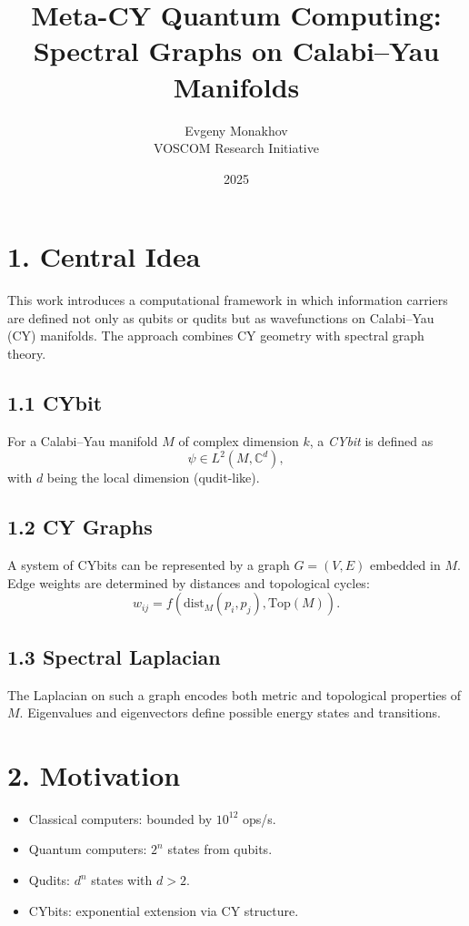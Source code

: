\documentclass[12pt,a4paper]{article}
\title{Meta-CY Quantum Computing: Spectral Graphs on Calabi--Yau Manifolds}
\author{Evgeny Monakhov \\ VOSCOM Research Initiative}
\date{2025}
\begin{document}
\maketitle

\section*{1. Central Idea}
This work introduces a computational framework in which 
information carriers are defined not only as qubits or qudits 
but as wavefunctions on Calabi--Yau (CY) manifolds. 
The approach combines CY geometry with spectral graph theory.

\subsection*{1.1 CYbit}
For a Calabi--Yau manifold $M$ of complex dimension $k$, 
a \emph{CYbit} is defined as
\begin{equation}
\psi \in L^2(M, \mathbb{C}^d),
\end{equation}
with $d$ being the local dimension (qudit-like). 

\subsection*{1.2 CY Graphs}
A system of CYbits can be represented by a graph $G=(V,E)$ 
embedded in $M$. Edge weights are determined by distances 
and topological cycles:
\begin{equation}
w_{ij} = f(\mathrm{dist}_M(p_i,p_j), \mathrm{Top}(M)).
\end{equation}

\subsection*{1.3 Spectral Laplacian}
The Laplacian on such a graph encodes 
both metric and topological properties of $M$. 
Eigenvalues and eigenvectors define 
possible energy states and transitions.

\section*{2. Motivation}
\begin{itemize}
  \item Classical computers: bounded by $10^{12}$ ops/s.
  \item Quantum computers: $2^n$ states from qubits.
  \item Qudits: $d^n$ states with $d > 2$.
  \item CYbits: exponential extension via CY structure.
\end{itemize}
\end{document}
